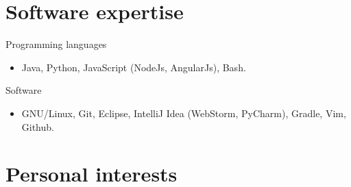 \documentclass{res}
\newcommand{\inFrench}[1]{}
\newcommand{\inEnglish}[1]{#1}
\begin{document}
\begin{resume}
{	\section{Software expertise}
}
\vspace{6pt}

\inFrench{
	Langages de programmation
	\vspace{0.05in}
	\begin{itemize}
		\item Java, Python, JavaScript (NodeJs, AngularJs), Bash.
	\end{itemize}

	Logiciels maîtrisés
	\vspace{0.05in}
	\begin{itemize}
		\item GNU/Linux, Git, Eclipse, IntelliJ Idea (WebStorm, PyCharm), Gradle, Vim, Github.
	\end{itemize}
}

\inEnglish{
	Programming languages
	\vspace{0.05in}
	\begin{itemize}
		\item Java, Python, JavaScript (NodeJs, AngularJs), Bash.
	\end{itemize}

	Software
	\vspace{0.05in}
	\begin{itemize}
		\item GNU/Linux, Git, Eclipse, IntelliJ Idea (WebStorm, PyCharm), Gradle, Vim, Github.
	\end{itemize}
}

\newpage

\inFrench{
	\section{Intérêts personnels}
}
\inEnglish{
	\section{Personal interests}
}
\vspace{6pt}

\inFrench{
	\vspace{6pt}
	\begin{itemize} \itemsep -2pt
		\item Logiciels libres et open source;
		\item Développement Linux Kernel et projet Debian;
		\item Algorithmie et intelligence artificielle;
		\item Conception de jeux vidéos et ludification (gamification).
	\end{itemize}
}


\end{resume}
\end{document}
